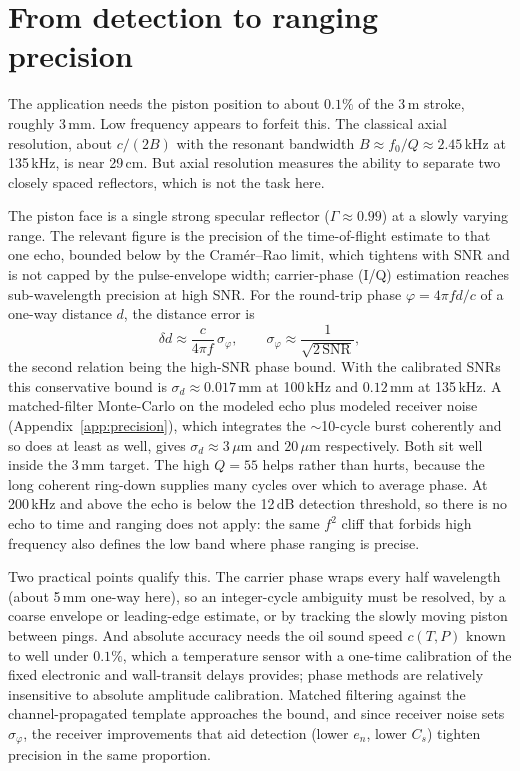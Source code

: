 \documentclass{article}
\begin{document}
\section{From detection to ranging precision}\label{sec:precision}
The application needs the piston position to about $0.1\%$ of the 3\,m stroke, roughly 3\,mm.
Low frequency appears to forfeit this. The classical axial resolution, about $c/(2B)$ with the
resonant bandwidth $B\approx f_0/Q\approx 2.45$\,kHz at 135\,kHz, is near 29\,cm. But axial
resolution measures the ability to separate two closely spaced reflectors, which is not the
task here.

The piston face is a single strong specular reflector ($\Gamma\approx0.99$) at a slowly
varying range. The relevant figure is the precision of the time-of-flight estimate to that one
echo, bounded below by the Cram\'er--Rao limit, which tightens with SNR and is not capped by
the pulse-envelope width; carrier-phase (I/Q) estimation reaches sub-wavelength precision at
high SNR. For the round-trip phase $\varphi = 4\pi f d/c$ of a one-way distance $d$, the
distance error is
\begin{equation}
\delta d \approx \frac{c}{4\pi f}\,\sigma_\varphi, \qquad \sigma_\varphi \approx \frac{1}{\sqrt{2\,\mathrm{SNR}}} ,
\label{eq:crlb}
\end{equation}
the second relation being the high-SNR phase bound. With the calibrated SNRs this conservative
bound is $\sigma_d\approx 0.017$\,mm at 100\,kHz and $0.12$\,mm at 135\,kHz. A matched-filter
Monte-Carlo on the modeled echo plus modeled receiver noise (Appendix~\ref{app:precision}),
which integrates the $\sim$10-cycle burst coherently and so does at least as well, gives
$\sigma_d\approx 3\,\mu$m and $20\,\mu$m respectively. Both sit well inside the 3\,mm target.
The high $Q=55$ helps rather than hurts, because the long coherent ring-down supplies many
cycles over which to average phase. At 200\,kHz and above the echo is below the 12\,dB
detection threshold, so there is no echo to time and ranging does not apply: the same $f^2$
cliff that forbids high frequency also defines the low band where phase ranging is precise.

Two practical points qualify this. The carrier phase wraps every half wavelength (about 5\,mm
one-way here), so an integer-cycle ambiguity must be resolved, by a coarse envelope or
leading-edge estimate, or by tracking the slowly moving piston between pings. And absolute
accuracy needs the oil sound speed $c(T,P)$ known to well under $0.1\%$, which a temperature
sensor with a one-time calibration of the fixed electronic and wall-transit delays provides;
phase methods are relatively insensitive to absolute amplitude calibration. Matched filtering
against the channel-propagated template approaches the bound, and since receiver noise sets
$\sigma_\varphi$, the receiver improvements that aid detection (lower $e_n$, lower $C_s$)
tighten precision in the same proportion.
\end{document}
